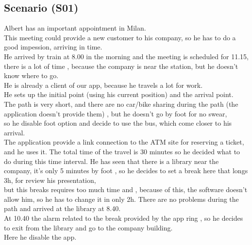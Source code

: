 \documentclass[a4paper,leqno]{book}
\begin{document}
\subsection{Scenario (S01) }
Albert has an important appointment in Milan.\\
This meeting could provide a new customer to his company, so he has to do a good impession, arriving in time.\\
He arrived by train at 8.00 in the morning and the meeting is scheduled for 11.15, there is a lot of time , because 
the company is near the station, but he doesn't know where to go.\\
He is already a client of our app, because he travels a lot for work.\\
He sets up the initial point (using his current position) and the arrival point.\\
The path is very short, and there are no car/bike sharing during the path (the application doesn't provide them) , but he doesn't go by foot for no swear,\\
so he disable foot option and decide to use the bus, which come closer to his arrival.\\
The application provide a link connection to the ATM site for reserving a ticket, and he uses it.
The total time of the travel is 30 minutes so he decided what to do during this time interval.
He has seen that there is a library near the company, it's only 5 minutes by foot , so he decides to set a break here that longs 3h, for review his presentation,\\
but this breaks requires too much time and , because of this, the software doesn't allow him, so he has to change it in only 2h.
There are no problems during the path and arrived at the library at 8.40.\\
At 10.40 the alarm related to the break provided by the app ring , so he decides to exit from the library and go to the company building.\\
Here he disable the app.
\end{document}
